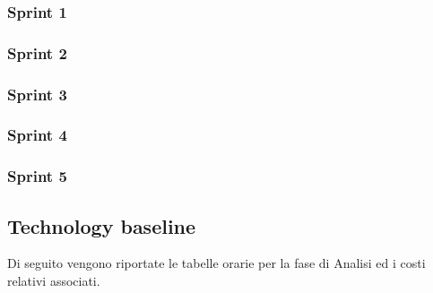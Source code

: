 \subsubsection{Sprint 1}
\subsubsection{Sprint 2}
\subsubsection{Sprint 3}
\subsubsection{Sprint 4}
\subsubsection{Sprint 5}




\subsection{Technology baseline}
Di seguito vengono riportate le tabelle orarie per la fase di Analisi ed i costi relativi associati.

